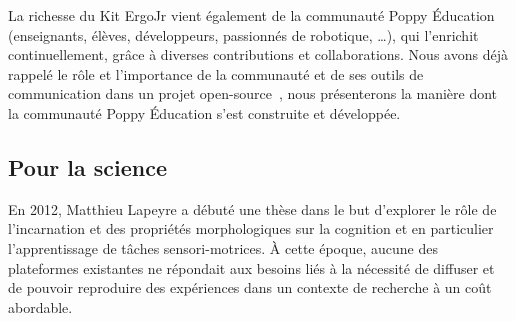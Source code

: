     La richesse du Kit ErgoJr vient également de la communauté Poppy Éducation (enseignants, élèves, développeurs, passionnés de robotique, \dots), qui l’enrichit continuellement, grâce à diverses contributions et collaborations. Nous avons déjà rappelé le rôle et l'importance de la communauté et de ses outils de communication dans un projet open-source~, nous présenterons la manière dont la communauté Poppy Éducation s'est construite et développée.
    \subsection{Pour la science}\label{sec:poppy_science}
        En 2012, Matthieu Lapeyre a débuté une thèse dans le but d’explorer le rôle de l’incarnation et des propriétés morphologiques sur la cognition et en particulier l’apprentissage de tâches sensori-motrices. À cette époque, aucune des plateformes existantes ne répondait aux besoins liés à la nécessité de diffuser et de pouvoir reproduire des expériences dans un contexte de recherche à un coût abordable.
